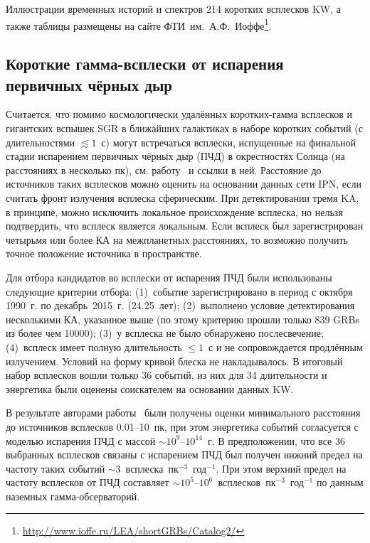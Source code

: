 Иллюстрации временных историй и спектров 214 коротких всплесков KW, а также таблицы размещены на сайте
ФТИ~им.~А.Ф.~Иоффе\footnote{\url{http://www.ioffe.ru/LEA/shortGRBs/Catalog2/}}.
\FloatBarrier

\subsection{Короткие гамма-всплески от испарения первичных чёрных дыр}
Считается, что помимо космологически удалённых коротких-гамма всплесков и гигантских вспышек SGR 
в ближайших галактиках в наборе коротких событий (с длительностями $\lesssim 1$~с) 
могут встречаться всплески, испущенные на финальной стадии испарением первичных чёрных дыр (ПЧД) 
в окрестностях Солнца (на расстояниях в несколько пк), см. работу~\citep{Ukwatta_2015arXiv151201264U} и ссылки в ней. 
Расстояние до источников таких всплесков можно оценить на основании данных 
сети IPN, если считать фронт излучения всплеска сферическим. 
При детектировании тремя KA, в принципе, можно исключить локальное происхождение всплеска,
но нельзя подтвердить, что всплеск является локальным.
Если всплеск был зарегистрирован четырьмя или более КА на межпланетных расстояниях,
то возможно получить точное положение источника в пространстве.

Для отбора кандидатов во всплески от испарения ПЧД были использованы следующие 
критерии отбора: 
(1)~событие зарегистрировано в период с октября 1990~г. по декабрь~2015~г. (24.25~лет);
(2)~выполнено условие детектирования несколькими КА, указанное выше 
(по этому критерию прошли только 839 GRBs из более чем 10000);
(3)~у всплеска не было обнаружено послесвечение;
(4)~всплеск имеет полную длительность $\leq 1$~с и не сопровождается продлённым излучением.
Условий на форму кривой блеска не накладывалось.
В итоговый набор всплесков вошли только 36 событий, из них для 34 длительности и 
энергетика были оценены соискателем на основании данных KW.

В результате авторами работы~\citep{Ukwatta_2015arXiv151201264U} были получены 
оценки минимального расстояния до источников всплесков
0.01--10~пк, при этом энергетика событий согласуется с моделью испарения ПЧД 
с массой $\sim 10^9\textrm{--}10^{14}$~г. В предположении, что все 36 выбранных всплесков связаны 
с испарением ПЧД был получен нижний предел на частоту таких 
событий $\sim 3$~всплеска~пк$^{-3}$~год$^{-1}$. При этом верхний предел на частоту 
всплесков от ПЧД составляет $\sim 10^5\textrm{--}10^6$~всплесков~пк$^{-3}$~год$^{-1}$ 
по данным наземных гамма-обсерваторий.

